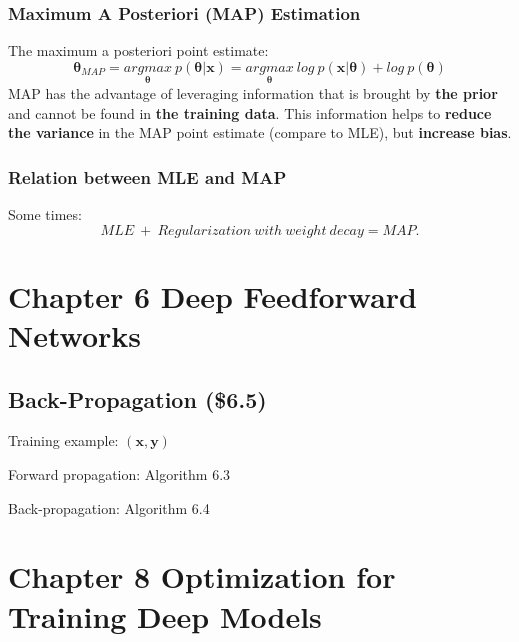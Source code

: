 \documentclass[12pt]{article}
\numberwithin{equation}{section}
\begin{document}
\subsubsection{Maximum A Posteriori (MAP) Estimation}
The maximum a posteriori point estimate:
\begin{equation}
	\boldsymbol\theta_{MAP}=\underset{\boldsymbol\theta}{argmax} \  p(\boldsymbol{\theta|x})=\underset{\boldsymbol\theta}{argmax} \ log \  p(\boldsymbol{x|\theta})+log\ p(\boldsymbol{\theta})
\end{equation}
MAP has the advantage of leveraging information that is brought by \textbf{the prior} and cannot be found in \textbf{the training data}. This information helps to \textbf{reduce the variance} in the MAP point estimate (compare to MLE), but \textbf{increase bias}. \par
\subsubsection{Relation between MLE and MAP}
Some times:
\begin{equation}
MLE \ + \ Regularization\ with\ weight\ decay = MAP .
\end{equation}
\section{Chapter 6 Deep Feedforward Networks}
\subsection{Back-Propagation (\$6.5)}
Training example: $(\mathbf{x}, \mathbf{y})$ \par
Forward propagation: Algorithm 6.3 \par
Back-propagation: Algorithm 6.4 \par
\section{Chapter 8 Optimization for Training Deep Models}
\end{document}
